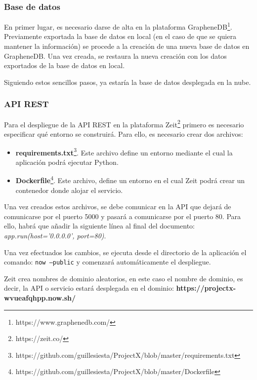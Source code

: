 \subsubsection{Base de datos}
En primer lugar, es necesario darse  de alta en la plataforma GrapheneDB\footnote{https://www.graphenedb.com/}. Previamente exportada la base de datos en local (en el caso de que se quiera mantener la información) se procede a la creación de una nueva base de datos en GrapheneDB. Una vez creada, se restaura la nueva creación con los datos exportados de la base de datos en local\cite{graphenedb}.

Siguiendo estos sencillos pasos, ya estaría la base de datos desplegada en la nube.


\subsubsection{API REST}

Para el despliegue de la API REST en la plataforma Zeit\footnote{https://zeit.co/} primero es necesario especificar qué entorno se construirá. Para ello, es necesario crear dos archivos:

\begin{itemize}
    \item \textbf{requirements.txt}\footnote{https://github.com/guillesiesta/ProjectX/blob/master/requirements.txt}. Este archivo define un entorno mediante el cual la aplicación podrá ejecutar Python.
    
    \item \textbf{Dockerfile}\footnote{https://github.com/guillesiesta/ProjectX/blob/master/Dockerfile}. Este archivo,  define un entorno en el cual Zeit podrá crear un contenedor donde alojar el servicio.
\end{itemize}

Una vez creados estos archivos, se debe comunicar en la API que dejará de comunicarse por el puerto 5000 y pasará a comunicarse por el puerto 80. Para ello, habrá que añadir la siguiente línea al final del documento: \textit{app.run(host='0.0.0.0', port=80)}.

Una vez efectuados los cambios, se ejecuta desde el directorio de la aplicación el comando: \texttt{now --public} y comenzará automáticamente el despliegue. 

Zeit crea nombres de dominio aleatorios, en este caso el nombre de dominio, es decir, la API o servicio estará desplegada en el dominio: \textbf{https://projectx-wvueafqhpp.now.sh/}

